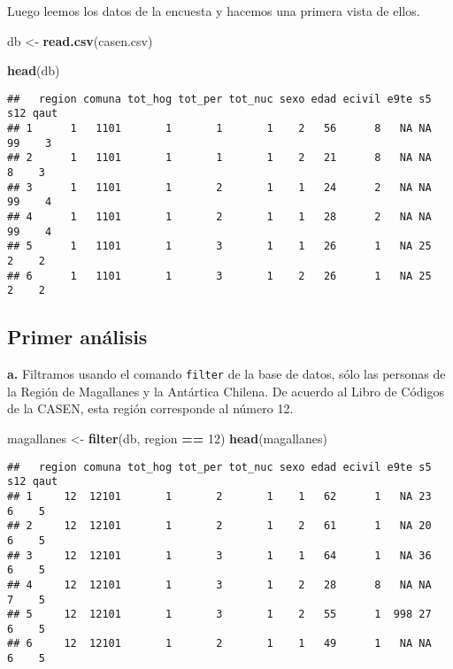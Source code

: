 \documentclass[
]{article}
\newenvironment{Shaded}{\begin{snugshade}}{\end{snugshade}}
\newcommand{\DecValTok}[1]{\textcolor[rgb]{0.00,0.00,0.81}{#1}}
\newcommand{\FunctionTok}[1]{\textcolor[rgb]{0.13,0.29,0.53}{\textbf{#1}}}
\newcommand{\NormalTok}[1]{#1}
\newcommand{\OtherTok}[1]{\textcolor[rgb]{0.56,0.35,0.01}{#1}}
\newcommand{\SpecialCharTok}[1]{\textcolor[rgb]{0.81,0.36,0.00}{\textbf{#1}}}
\newcommand{\StringTok}[1]{\textcolor[rgb]{0.31,0.60,0.02}{#1}}
\begin{document}
Luego leemos los datos de la encuesta y hacemos una primera vista de
ellos.

\begin{Shaded}
\begin{Highlighting}[]
\NormalTok{db }\OtherTok{\textless{}{-}} \FunctionTok{read.csv}\NormalTok{(}\StringTok{\textquotesingle{}casen.csv\textquotesingle{}}\NormalTok{)}
\end{Highlighting}
\end{Shaded}

\begin{Shaded}
\begin{Highlighting}[]
\FunctionTok{head}\NormalTok{(db)}
\end{Highlighting}
\end{Shaded}

\begin{verbatim}
##   region comuna tot_hog tot_per tot_nuc sexo edad ecivil e9te s5 s12 qaut
## 1      1   1101       1       1       1    2   56      8   NA NA  99    3
## 2      1   1101       1       1       1    2   21      8   NA NA   8    3
## 3      1   1101       1       2       1    1   24      2   NA NA  99    4
## 4      1   1101       1       2       1    1   28      2   NA NA  99    4
## 5      1   1101       1       3       1    1   26      1   NA 25   2    2
## 6      1   1101       1       3       1    2   26      1   NA 25   2    2
\end{verbatim}

\hypertarget{primer-anuxe1lisis}{%
\subsection{Primer análisis}\label{primer-anuxe1lisis}}

\textbf{a.} Filtramos usando el comando \texttt{filter} de la base de
datos, sólo las personas de la Región de Magallanes y la Antártica
Chilena. De acuerdo al Libro de Códigos de la CASEN, esta región
corresponde al número 12.

\begin{Shaded}
\begin{Highlighting}[]
\NormalTok{magallanes }\OtherTok{\textless{}{-}} \FunctionTok{filter}\NormalTok{(db, region }\SpecialCharTok{==} \DecValTok{12}\NormalTok{)}
\FunctionTok{head}\NormalTok{(magallanes)}
\end{Highlighting}
\end{Shaded}

\begin{verbatim}
##   region comuna tot_hog tot_per tot_nuc sexo edad ecivil e9te s5 s12 qaut
## 1     12  12101       1       2       1    1   62      1   NA 23   6    5
## 2     12  12101       1       2       1    2   61      1   NA 20   6    5
## 3     12  12101       1       3       1    1   64      1   NA 36   6    5
## 4     12  12101       1       3       1    2   28      8   NA NA   7    5
## 5     12  12101       1       3       1    2   55      1  998 27   6    5
## 6     12  12101       1       2       1    1   49      1   NA NA   6    5
\end{verbatim}
\end{document}
